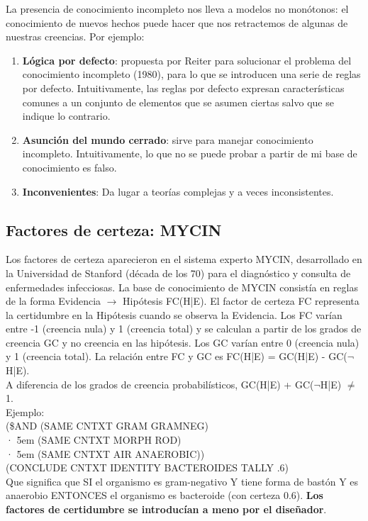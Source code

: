 \documentclass[12pt]{article}
\begin{document}
La presencia de conocimiento incompleto nos lleva a modelos no monótonos: el conocimiento de nuevos hechos puede hacer que nos retractemos de algunas de nuestras creencias. Por ejemplo:
\begin{enumerate}
\item \textbf{Lógica por defecto}: propuesta por Reiter para solucionar el problema del conocimiento incompleto (1980), para lo que se introducen una serie de reglas por defecto. Intuitivamente, las reglas por defecto expresan características comunes a un conjunto de elementos que se asumen ciertas salvo que se indique lo contrario.
\item \textbf{Asunción del mundo cerrado}: sirve para manejar conocimiento incompleto.  Intuitivamente, lo que no se puede probar a partir de mi base de conocimiento es falso.
\item \textbf{Inconvenientes}: Da lugar a teorías complejas y a veces inconsistentes.
\end{enumerate}

\subsection{Factores de certeza: MYCIN}
Los factores de certeza aparecieron en el sistema experto MYCIN, desarrollado en la Universidad de Stanford (década de los 70) para el diagnóstico y consulta de enfermedades infecciosas. La base de conocimiento de MYCIN consistía en reglas de la forma Evidencia $\rightarrow$ Hipótesis FC(H|E). El factor de certeza FC representa la certidumbre en la Hipótesis cuando se observa la Evidencia. Los FC varían entre -1 (creencia nula) y 1 (creencia total) y se calculan a partir de los grados de creencia GC y no creencia en las hipótesis. Los GC varían entre 0 (creencia nula) y 1 (creencia total). La relación entre FC y GC es FC(H|E) = GC(H|E) - GC($\neg$H|E).\\
A diferencia de los grados de creencia probabilísticos, GC(H|E) + GC($\neg$H|E) $\neq$ 1. \\

Ejemplo:\\
(\$AND \qquad (SAME CNTXT GRAM GRAMNEG)\\
· \kern 5em (SAME CNTXT MORPH ROD)\\
· \kern 5em (SAME CNTXT AIR ANAEROBIC))\\
(CONCLUDE CNTXT IDENTITY BACTEROIDES TALLY .6)\\

Que significa que SI el organismo es gram-negativo Y tiene forma de bastón Y es anaerobio ENTONCES el organismo es bacteroide (con certeza 0.6). \textbf{Los factores de certidumbre se introducían a meno por el diseñador}.
\end{document}
